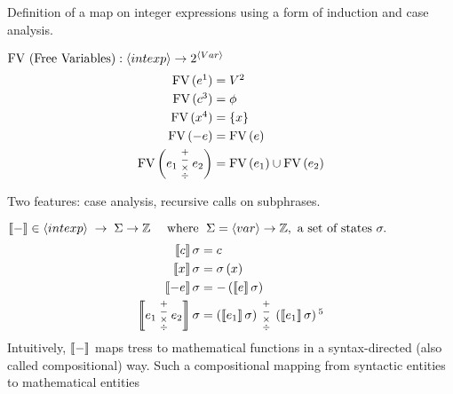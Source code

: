 \begin{enumcirc}
	\item
	Definition of a map on integer expressions using a form of induction and
	case analysis.
	\item
	$ \textrm{FV (Free Variables)}: \left\langle intexp \right\rangle \rightarrow 2^{\left\langle Var \right\rangle} $
	\begin{align*}
		\fv{e\footnotemark} & = V \footnotemark \\
		\fv{c\footnotemark} & = \phi            \\
		\fv{x\footnotemark} & = \braces{x}      \\
		\fv{-e}             & = \fv{e}          \\
		\fv{e_1 \; \substack{+                  \\-\\\times\\\div} \; e_2} &= \fv{e_1} \cup \fv{e_2}
	\end{align*}
	\item
	Two features: case analysis, recursive calls on subphrases.
	\item
	$ \left\llbracket - \right\rrbracket \in \left\langle intexp \right\rangle \; \rightarrow \;
		\Sigma \rightarrow \mathbb{Z}
		\quad \textrm{ where } \; \Sigma = \left\langle var \right\rangle \rightarrow \mathbb{Z} , \textrm{ a set of states }
		\sigma. $
	\begin{align*}
		\bbrackets{c}\sigma  & = c                             \\
		\bbrackets{x}\sigma  & = \sigma\prths{x}               \\
		\bbrackets{-e}\sigma & = -\prths{\bbrackets{e}\sigma}  \\
		\bbrackets{
		e_1 \;\substack{+                                      \\-\\\times\\\div}\; e_2
		}\sigma              & = \prths{\bbrackets{e_1}\sigma}
		\;\substack{+                                          \\-\\\times\\\div}\;
		\prths{\bbrackets{e_1}\sigma} \footnotemark
	\end{align*}
	Intuitively, $\left\llbracket - \right\rrbracket$ maps tress to mathematical functions in a
	syntax-directed (also called compositional) way.
	Such a compositional mapping from syntactic entities to mathematical entities

\end{enumcirc}
